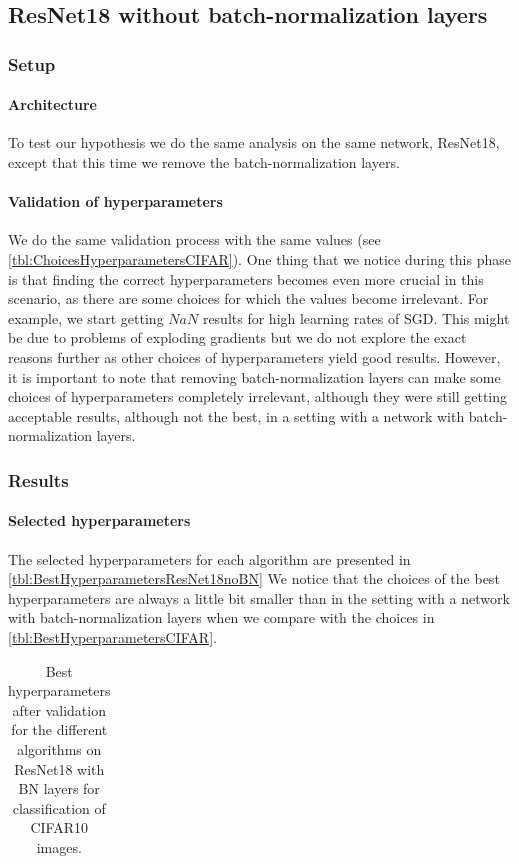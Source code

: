 \documentclass[a4paper,11pt,oneside]{report}
\begin{document}
\subsection{ResNet18 without batch-normalization layers}
\subsubsection{Setup}
\paragraph{Architecture}
To test our hypothesis we do the same analysis on the same network, ResNet18, except that this time we remove the batch-normalization layers. 
\paragraph{Validation of hyperparameters}
We do the same validation process with the same values (see \autoref{tbl:ChoicesHyperparametersCIFAR}). One thing that we notice during this phase is that finding the correct hyperparameters becomes even more crucial in this scenario, as there are some choices for which the values become irrelevant. For example, we start getting $NaN$ results for high learning rates of SGD. This might be due to problems of exploding gradients but we do not explore the exact reasons further as other choices of hyperparameters yield good results. However, it is important to note that removing batch-normalization layers can make some choices of hyperparameters completely irrelevant, although they were still getting acceptable results, although not the best, in a setting with a network with batch-normalization layers.

\subsubsection{Results}
\paragraph{Selected hyperparameters}
The selected hyperparameters for each algorithm are presented in \autoref{tbl:BestHyperparametersResNet18noBN}
We notice that the choices of the best hyperparameters are always a little bit smaller than in the setting with a network with batch-normalization layers when we compare with the choices in \autoref{tbl:BestHyperparametersCIFAR}.

\begin{table}
    \begin{center}
        \begin{tabular}{||c | c | l||}
             \hline
             
        \end{tabular}
    \end{center}
    \caption{Best hyperparameters after validation for the different algorithms on ResNet18 with BN layers for classification of CIFAR10 images.
    }
    \label{tbl:BestHyperparametersResNet18noBN}
\end{table}
\end{document}
